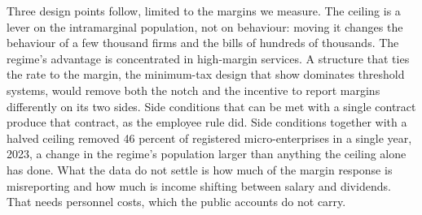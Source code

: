 \documentclass[12pt]{article}
\begin{document}
Three design points follow, limited to the margins we measure. The ceiling is a lever on the intramarginal population, not on behaviour: moving it changes the behaviour of a few thousand firms and the bills of hundreds of thousands. The regime's advantage is concentrated in high-margin services. A structure that ties the rate to the margin, the minimum-tax design that \citet{sharma2025dual} show dominates threshold systems, would remove both the notch and the incentive to report margins differently on its two sides. Side conditions that can be met with a single contract produce that contract, as the employee rule did. Side conditions together with a halved ceiling removed 46 percent of registered micro-enterprises in a single year, 2023, a change in the regime's population larger than anything the ceiling alone has done. What the data do not settle is how much of the margin response is misreporting and how much is income shifting between salary and dividends. That needs personnel costs, which the public accounts do not carry.
\end{document}
